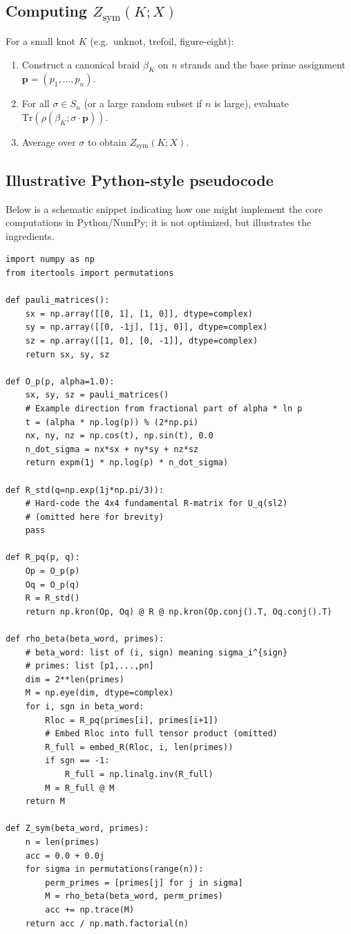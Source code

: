 \documentclass[11pt]{article}
\begin{document}
\subsection{Computing $Z_{\mathrm{sym}}(K;X)$}

For a small knot $K$ (e.g.\ unknot, trefoil, figure-eight):

\begin{enumerate}[leftmargin=1.5em]
  \item Construct a canonical braid $\beta_K$ on $n$ strands and the base prime assignment $\mathbf p=(p_1,\dots,p_n)$.
  \item For all $\sigma\in S_n$ (or a large random subset if $n$ is large), evaluate $\mathrm{Tr}(\rho(\beta_K;\sigma\cdot\mathbf p))$.
  \item Average over $\sigma$ to obtain $Z_{\mathrm{sym}}(K;X)$.
\end{enumerate}

\subsection{Illustrative Python-style pseudocode}

Below is a schematic snippet indicating how one might implement the core computations in Python/NumPy; it is not optimized, but illustrates the ingredients.

\begin{verbatim}
import numpy as np
from itertools import permutations

def pauli_matrices():
    sx = np.array([[0, 1], [1, 0]], dtype=complex)
    sy = np.array([[0, -1j], [1j, 0]], dtype=complex)
    sz = np.array([[1, 0], [0, -1]], dtype=complex)
    return sx, sy, sz

def O_p(p, alpha=1.0):
    sx, sy, sz = pauli_matrices()
    # Example direction from fractional part of alpha * ln p
    t = (alpha * np.log(p)) % (2*np.pi)
    nx, ny, nz = np.cos(t), np.sin(t), 0.0
    n_dot_sigma = nx*sx + ny*sy + nz*sz
    return expm(1j * np.log(p) * n_dot_sigma)

def R_std(q=np.exp(1j*np.pi/3)):
    # Hard-code the 4x4 fundamental R-matrix for U_q(sl2)
    # (omitted here for brevity)
    pass

def R_pq(p, q):
    Op = O_p(p)
    Oq = O_p(q)
    R = R_std()
    return np.kron(Op, Oq) @ R @ np.kron(Op.conj().T, Oq.conj().T)

def rho_beta(beta_word, primes):
    # beta_word: list of (i, sign) meaning sigma_i^{sign}
    # primes: list [p1,...,pn]
    dim = 2**len(primes)
    M = np.eye(dim, dtype=complex)
    for i, sgn in beta_word:
        Rloc = R_pq(primes[i], primes[i+1])
        # Embed Rloc into full tensor product (omitted)
        R_full = embed_R(Rloc, i, len(primes))
        if sgn == -1:
            R_full = np.linalg.inv(R_full)
        M = R_full @ M
    return M

def Z_sym(beta_word, primes):
    n = len(primes)
    acc = 0.0 + 0.0j
    for sigma in permutations(range(n)):
        perm_primes = [primes[j] for j in sigma]
        M = rho_beta(beta_word, perm_primes)
        acc += np.trace(M)
    return acc / np.math.factorial(n)
\end{verbatim}
\end{document}
